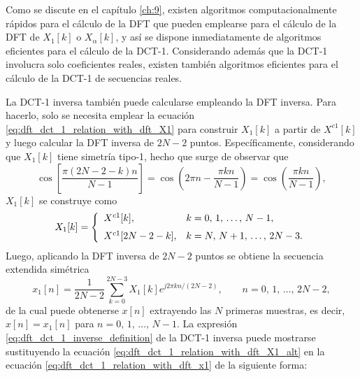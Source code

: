 \documentclass[a4paper]{report}
\begin{document}
Como se discute en el capítulo \ref{ch:9}, existen algoritmos computacionalmente rápidos para el cálculo de la DFT que pueden emplearse para el cálculo de la DFT de \(X_1[k]\) o \(X_\alpha[k]\), y así se dispone inmediatamente de algoritmos eficientes para el cálculo de la DCT-1. Considerando además que la DCT-1 involucra solo coeficientes reales, existen también algoritmos eficientes para el cálculo de la DCT-1 de secuencias reales.

La DCT-1 inversa también puede calcularse empleando la DFT inversa. Para hacerlo, solo se necesita emplear la ecuación \ref{eq:dft_dct_1_relation_with_dft_X1} para construir \(X_1[k]\) a partir de \(X^{c1}[k]\) y luego calcular la DFT inversa de \(2N-2\) puntos. Específicamente, considerando que \(X_1[k]\) tiene simetría tipo-1, hecho que surge de observar que 
\[
 \cos\left[\dfrac{\pi(2N-2-k)n}{N-1}\right]=\cos\left(2\pi n-\dfrac{\pi kn}{N-1}\right)=\cos\left(\frac{\pi kn}{N-1}\right),
\]
\(X_1[k]\) se construye como
\begin{equation}\label{eq:dft_dct_1_relation_with_dft_X1_alt}
 X_1[k]=
 \left\{ 
 \begin{array}{ll}
  X^{c1}[k],& k=0,\,1,\,\dots,\,N-1,\\[\medskipamount]
  X^{c1}[2N-2-k],& k=N,\,N+1,\,\dots,\,2N-3.
 \end{array}
 \right. 
\end{equation}
Luego, aplicando la DFT inversa de \(2N-2\) puntos se obtiene la secuencia extendida simétrica
\begin{equation}\label{eq:dft_dct_1_relation_with_dft_x1}
 x_1[n]=\frac{1}{2N-2}\sum_{k=0}^{2N-3}X_1[k]e^{j2\pi kn/(2N-2)},
 \qquad 
 n=0,\,1,\,\dots,\,2N-2, 
\end{equation}
de la cual puede obtenerse \(x[n]\) extrayendo las \(N\) primeras muestras, es decir, \(x[n]=x_1[n]\) para \(n=0,\,1,\,\dots,\,N-1\). La expresión \ref{eq:dft_dct_1_inverse_definition} de la DCT-1 inversa puede mostrarse sustituyendo la ecuación \ref{eq:dft_dct_1_relation_with_dft_X1_alt} en la ecuación \ref{eq:dft_dct_1_relation_with_dft_x1} de la siguiente forma:
\end{document}

